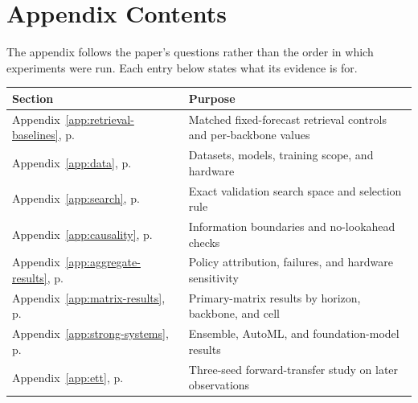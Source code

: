 \section*{Appendix Contents}
{}

\noindent The appendix follows the paper's questions rather than the order in
which experiments were run. Each entry below states what its evidence is for.

\begin{center}
\small
\setlength{\tabcolsep}{4pt}
\begin{tabular}{@{}p{}p{}@{}}
\toprule
Section & Purpose\\
\midrule
Appendix~\ref{app:retrieval-baselines}, p.~\pageref{app:retrieval-baselines}
& Matched fixed-forecast retrieval controls and per-backbone values\\
Appendix~\ref{app:data}, p.~\pageref{app:data}
& Datasets, models, training scope, and hardware\\
Appendix~\ref{app:search}, p.~\pageref{app:search}
& Exact validation search space and selection rule\\
Appendix~\ref{app:causality}, p.~\pageref{app:causality}
& Information boundaries and no-lookahead checks\\
Appendix~\ref{app:aggregate-results}, p.~\pageref{app:aggregate-results}
& Policy attribution, failures, and hardware sensitivity\\
Appendix~\ref{app:matrix-results}, p.~\pageref{app:matrix-results}
& Primary-matrix results by horizon, backbone, and cell\\
Appendix~\ref{app:strong-systems}, p.~\pageref{app:strong-systems}
& Ensemble, AutoML, and foundation-model results\\
Appendix~\ref{app:ett}, p.~\pageref{app:ett}
& Three-seed forward-transfer study on later observations\\
\bottomrule
\end{tabular}
\end{center}


\clearpage

\clearpage

\clearpage

\clearpage


\clearpage

\clearpage


